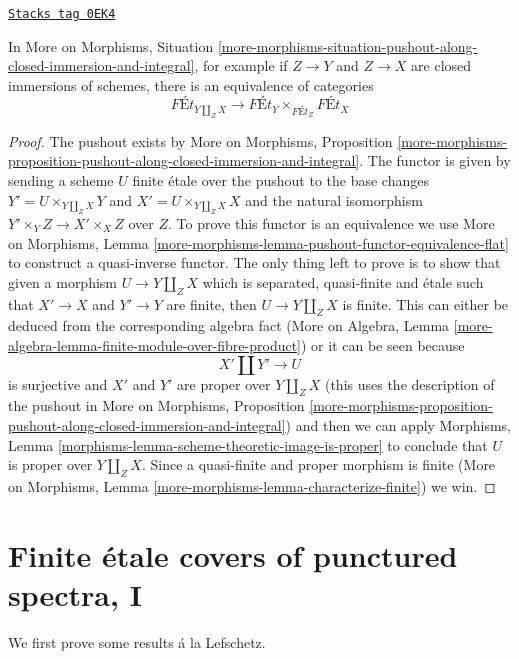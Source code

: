 \begin{lemma}
\label{pione-lemma-pushout-along-closed-immersion-and-integral}
\href{https://stacks.math.columbia.edu/tag/0EK4}{\texttt{Stacks tag 0EK4}}

In More on Morphisms, Situation
\ref{more-morphisms-situation-pushout-along-closed-immersion-and-integral},
for example if $Z \to Y$ and $Z \to X$ are closed immersions of schemes,
there is an equivalence of categories
$$
\textit{F\'Et}_{Y \amalg_Z X}
\longrightarrow
\textit{F\'Et}_Y
\times_{\textit{F\'Et}_Z}
\textit{F\'Et}_X
$$
\end{lemma}

\begin{proof}
The pushout exists by
More on Morphisms, Proposition
\ref{more-morphisms-proposition-pushout-along-closed-immersion-and-integral}.
The functor is given by sending a scheme $U$ finite \'etale over the
pushout to the base changes $Y' = U \times_{Y \amalg_Z X} Y$
and $X' = U \times_{Y \amalg_Z X} X$ and the natural isomorphism
$Y' \times_Y Z \to X' \times_X Z$ over $Z$. To prove this functor
is an equivalence we use
More on Morphisms, Lemma
\ref{more-morphisms-lemma-pushout-functor-equivalence-flat}
to construct a quasi-inverse functor.
The only thing left to prove is to show that given a morphism
$U \to Y \amalg_Z X$ which is separated, quasi-finite and \'etale
such that $X' \to X$ and $Y' \to Y$ are finite,
then $U \to Y \amalg_Z X$ is finite.
This can either be deduced from the corresponding algebra fact
(More on Algebra, Lemma
\ref{more-algebra-lemma-finite-module-over-fibre-product})
or it can be seen because
$$
X' \amalg Y' \to U
$$
is surjective and $X'$ and $Y'$ are proper over $Y \amalg_Z X$
(this uses the description of the pushout in More on Morphisms, Proposition
\ref{more-morphisms-proposition-pushout-along-closed-immersion-and-integral})
and then we can apply
Morphisms, Lemma \ref{morphisms-lemma-scheme-theoretic-image-is-proper}
to conclude that $U$ is proper over $Y \amalg_Z X$.
Since a quasi-finite and proper morphism is finite
(More on Morphisms, Lemma \ref{more-morphisms-lemma-characterize-finite})
we win.
\end{proof}

\section{Finite \'etale covers of punctured spectra, I}
\label{pione-section-pi1-punctured-spec}
We first prove some results \'a la Lefschetz.

